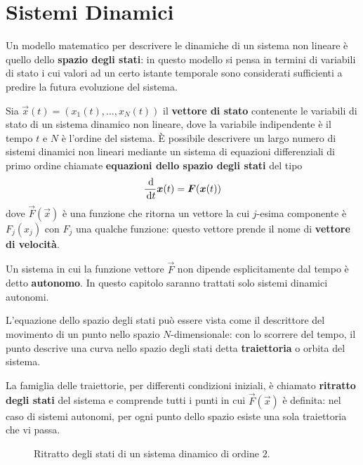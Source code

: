 
\chapter{Sistemi Dinamici}
\label{cha:sistemi_dinamici}

Un modello matematico per descrivere le dinamiche di un sistema non lineare è quello dello \textbf{spazio degli stati}: in questo modello si pensa in termini di variabili di stato i cui valori ad un certo istante temporale sono considerati sufficienti a predire la futura evoluzione del sistema.

Sia $\vec{x}(t) = (x_1(t), \dots, x_N(t))$ il \textbf{vettore di stato} contenente le variabili di stato di un sistema dinamico non lineare, dove la variabile indipendente è il tempo $t$ e $N$ è l'ordine del sistema. È possibile descrivere un largo numero di sistemi dinamici non lineari mediante un sistema di equazioni differenziali di primo ordine chiamate \textbf{equazioni dello spazio degli stati} del tipo
\begin{displaymath}
	\frac{\dif}{\dif t} \vec{x}(t) = \vec{F}(\vec{x}(t))
\end{displaymath}
dove $\vec{F}(\vec{x})$ è una funzione che ritorna un vettore la cui $j$-esima componente è $F_j(x_j)$ con $F_j$ una qualche funzione: questo vettore prende il nome di \textbf{vettore di velocità}.

Un sistema in cui la funzione vettore $\vec{F}$ non dipende esplicitamente dal tempo è detto \textbf{autonomo}. In questo capitolo saranno trattati solo sistemi dinamici autonomi.

L'equazione dello spazio degli stati può essere vista come il descrittore del movimento di un punto nello spazio $N$-dimensionale: con lo scorrere del tempo, il punto descrive una curva nello spazio degli stati detta \textbf{traiettoria} o orbita del sistema.

La famiglia delle traiettorie, per differenti condizioni iniziali, è chiamato \textbf{ritratto degli stati} del sistema e comprende tutti i punti in cui $\vec{F}(\vec{x})$ è definita: nel caso di sistemi autonomi, per ogni punto dello spazio esiste una sola traiettoria che vi passa.

\begin{figure}[h!]
	\centering
	\caption[Ritratto degli stati in un sistema dinamico]{Ritratto degli stati di un sistema dinamico di ordine $2$.}
\end{figure}

